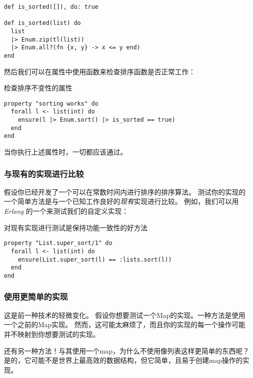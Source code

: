\begin{code}{}
\begin{verbatim}
def is_sorted([]), do: true

def is_sorted(list) do
  list
  |> Enum.zip(tl(list))
  |> Enum.all?(fn {x, y} -> x <= y end)
end
\end{verbatim}
\end{code}

然后我们可以在属性中使用函数来检查排序函数是否正常工作：

\begin{code}{检查排序不变性的属性}
\begin{verbatim}
property "sorting works" do
  forall l <- list(int) do
    ensure(l |> Enum.sort() |> is_sorted == true)
  end
end
\end{verbatim}
\label{lst:checking_the_sorting_invariant}
\end{code}

当你执行上述属性时，一切都应该通过。

\subsubsection{与现有的实现进行比较}

假设你已经开发了一个可以在常数时间内进行排序的排序算法。
测试你的实现的一个简单方法是与一个已知工作良好的\emph{现有}实现进行比较。
例如，我们可以用\emph{Erlang} 的一个来测试我们的自定义实现：

\begin{code}{对现有实现进行测试是保持功能一致性的好方法}
\begin{verbatim}
property "List.super_sort/1" do
  forall l <- list(int) do
    ensure(List.super_sort(l) == :lists.sort(l))
  end
end
\end{verbatim}
\label{lst:testing_against_an_existing_implementation}
\end{code}


\subsubsection{使用更简单的实现}

这是前一种技术的轻微变化。
假设你想要测试一个Map的实现。一种方法是使用一个之前的Map实现。
然而，这可能太麻烦了，而且你的实现的每一个操作可能并不映射到你想要测试的实现。

还有另一种方法！与其使用一个map，为什么不使用像列表这样更简单的东西呢？
是的，它可能不是世界上最高效的数据结构，但它简单，且易于创建map操作的实现。

